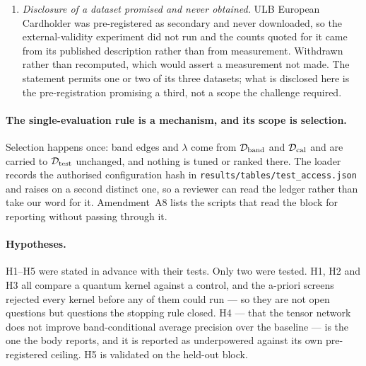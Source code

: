 \begin{enumerate}[label=A\arabic*.]
  every sweep and ablation runs on held-out slices of $\Dband$ or $\Dcal$;
  of the eleven scripts that read $\Dtest$, nine do so without the guard. Nothing was
  \emph{selected} there --- the ablation table feeds no claim, and every certified threshold
  comes from $\Dband$ and $\Dcal$ --- so the guarantee stands, but
  the sentence did not. The protocol was corrected rather than the scripts, which would have
  changed committed tables to retire a wording defect.
\item \emph{Disclosure of a dataset promised and never obtained.} ULB European Cardholder was
  pre-registered as secondary and never downloaded, so the external-validity experiment did not
  run and the counts quoted for it came from its published description rather than from
  measurement. Withdrawn rather than recomputed, which would assert a measurement not made. The
  statement permits one or two of its three datasets; what is disclosed here is the
  pre-registration promising a third, not a scope the challenge required.
\end{enumerate}

\paragraph{The single-evaluation rule is a mechanism, and its scope is selection.} Selection
happens once: band edges and $\lambda$ come from $\Dband$ and $\Dcal$ and are carried to
$\Dtest$ unchanged, and nothing is tuned or ranked there. The loader records the authorised configuration hash in
\texttt{results/tables/test\_access.json} and raises on a second distinct one, so a reviewer
can read the ledger rather than take our word for it. Amendment~A8 lists the scripts that read
the block for reporting without passing through it.

\paragraph{Hypotheses.} H1--H5 were stated in advance with their tests. Only two were tested.
H1, H2 and H3 all compare a quantum kernel against a control, and the a-priori screens rejected
every kernel before any of them could run --- so they are not open questions but questions the
stopping rule closed. H4 --- that the tensor network does not improve band-conditional average
precision over the baseline --- is the one the body reports, and it is reported as
underpowered against its own pre-registered ceiling. H5 is validated on the held-out block.
